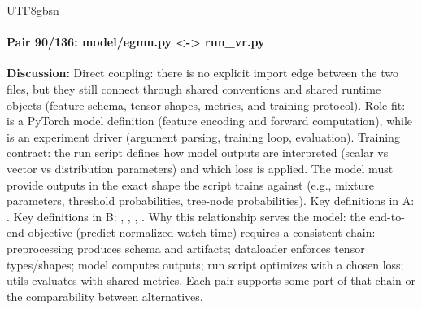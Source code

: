 \documentclass[11pt]{article}
\begin{document}
\begin{CJK*}{UTF8}{gbsn}
\paragraph{Pair 90/136: model/egmn.py <-> run\_vr.py}
\textbf{Discussion:} Direct coupling: there is no explicit import edge between the two files, but they still connect through shared conventions and shared runtime objects (feature schema, tensor shapes, metrics, and training protocol). Role fit: \texttt{} is a PyTorch model definition (feature encoding and forward computation), while \texttt{} is an experiment driver (argument parsing, training loop, evaluation). Training contract: the run script defines how model outputs are interpreted (scalar vs vector vs distribution parameters) and which loss is applied. The model must provide outputs in the exact shape the script trains against (e.g., mixture parameters, threshold probabilities, tree-node probabilities). Key definitions in A: \texttt{}. Key definitions in B: \texttt{}, \texttt{}, \texttt{}, \texttt{}. Why this relationship serves the model: the end-to-end objective (predict normalized watch-time) requires a consistent chain: preprocessing produces schema and artifacts; dataloader enforces tensor types/shapes; model computes outputs; run script optimizes with a chosen loss; utils evaluates with shared metrics. Each pair supports some part of that chain or the comparability between alternatives.


\end{CJK*}
\end{document}
